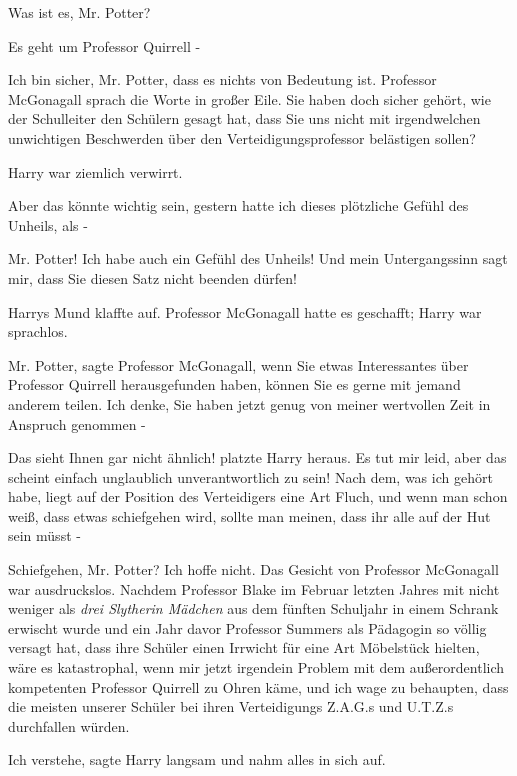 \glqq Was ist es, Mr. Potter?\grqq{}

\glqq Es geht um Professor Quirrell -\grqq{}

\glqq Ich bin sicher, Mr. Potter, dass es nichts von Bedeutung ist.\grqq{}
Professor McGonagall sprach die Worte in großer Eile. \glqq Sie haben doch
sicher gehört, wie der Schulleiter den Schülern gesagt hat, dass Sie uns nicht
mit irgendwelchen unwichtigen Beschwerden über den Verteidigungsprofessor
belästigen sollen?\grqq{}

Harry war ziemlich verwirrt.

\glqq Aber das könnte wichtig sein, gestern hatte ich dieses plötzliche Gefühl
des Unheils, als -\grqq{}

\glqq Mr. Potter! Ich habe auch ein Gefühl des Unheils! Und mein Untergangssinn
sagt mir, dass Sie diesen Satz nicht beenden dürfen!\grqq{}

Harrys Mund klaffte auf. Professor McGonagall hatte es geschafft; Harry war
sprachlos.

\glqq Mr. Potter\grqq{}, sagte Professor McGonagall, \glqq wenn Sie etwas
Interessantes über Professor Quirrell herausgefunden haben, können Sie es gerne
mit jemand anderem teilen. Ich denke, Sie haben jetzt genug von meiner
wertvollen Zeit in Anspruch genommen -\grqq{}

\glqq Das sieht Ihnen gar nicht ähnlich!\grqq{} platzte Harry heraus. \glqq Es
tut mir leid, aber das scheint einfach unglaublich unverantwortlich zu sein!
Nach dem, was ich gehört habe, liegt auf der Position des Verteidigers eine Art
Fluch, und wenn man schon weiß, dass etwas schiefgehen wird, sollte man meinen,
dass ihr alle auf der Hut sein müsst -\grqq{}

\glqq Schiefgehen, Mr. Potter? Ich hoffe nicht.\grqq{} Das Gesicht von Professor
McGonagall war ausdruckslos. \glqq Nachdem Professor Blake im Februar letzten
Jahres mit nicht weniger als \emph{drei Slytherin Mädchen }aus dem fünften
Schuljahr in einem Schrank erwischt wurde und ein Jahr davor Professor Summers
als Pädagogin so völlig versagt hat, dass ihre Schüler einen Irrwicht für eine
Art Möbelstück hielten, wäre es katastrophal, wenn mir jetzt irgendein Problem
mit dem außerordentlich kompetenten Professor Quirrell zu Ohren käme, und ich
wage zu behaupten, dass die meisten unserer Schüler bei ihren Verteidigungs
Z.A.G.s und U.T.Z.s durchfallen würden.\grqq{}

\glqq Ich verstehe\grqq{}, sagte Harry langsam und nahm alles in sich auf.

